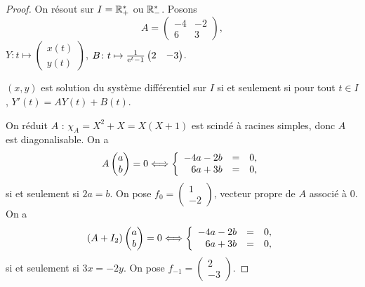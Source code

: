 \documentclass[12pt]{article}
\begin{document}
\begin{proof}
	On résout sur $I=\mathbb{R}_{+}^{*}$ ou $\mathbb{R}_{-}^{*}$. Posons 
	\begin{equation*}
		A=\begin{pmatrix}
			-4&-2\\
			6&3
		\end{pmatrix},
	\end{equation*}
	$Y\colon t\mapsto\begin{pmatrix}
		x(t)\\y(t)
	\end{pmatrix}$, $B\colon t\mapsto\frac{1}{\mathrm{e}^{t}-1}\begin{pmatrix}
		2&-3
	\end{pmatrix}$.

	$(x,y)$ est solution du système différentiel sur $I$ si et seulement si pour tout $t\in I$, $Y'(t)=AY(t)+B(t)$.

	On réduit $A$ : $\chi_{A}=X^{2}+X=X(X+1)$ est scindé à racines simples, donc $A$ est diagonalisable. On a 
	\begin{equation*}
		A\begin{pmatrix}
			a\\b
		\end{pmatrix}=0\Longleftrightarrow 
		\left\lbrace
			\begin{array}[]{rcl}
				-4a-2b&=&0,\\
				6a+3b&=&0,
			\end{array}
		\right.
	\end{equation*}
	si et seulement si $2a=b$. On pose $f_0=\begin{pmatrix}
		1\\-2
	\end{pmatrix}$, vecteur propre de $A$ associé à 0. On a 
	\begin{equation*}
		(A+I_2)\begin{pmatrix}
			a\\b
		\end{pmatrix}=0\Longleftrightarrow
		\left\lbrace
			\begin{array}[]{rcl}
				-4a-2b &=&0,\\
				6a+3b &=&0,
			\end{array}
		\right.
	\end{equation*}
	si et seulement si $3x=-2y$. On pose $f_{-1}=\begin{pmatrix}
		2\\-3
	\end{pmatrix}$.


\end{proof}
\end{document}
